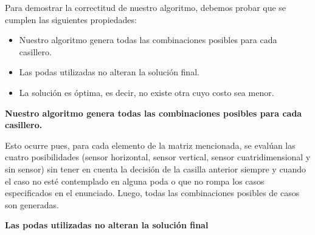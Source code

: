 Para demostrar la correctitud de nuestro algoritmo, debemos probar que se cumplen las siguientes propiedades:
\begin{itemize}
\item Nuestro algoritmo genera todas las combinaciones posibles para cada casillero.
\item Las podas utilizadas no alteran la solución final.
\item La solución es óptima, es decir, no existe otra cuyo costo sea menor.
\end{itemize}

\newline

\textbf{Nuestro algoritmo genera todas las combinaciones posibles para cada casillero.} \newline

Esto ocurre pues, para cada elemento de la matriz mencionada, se evalúan las cuatro posibilidades (sensor horizontal, sensor vertical, sensor cuatridimensional y sin sensor) sin tener en cuenta la decisión de la casilla anterior siempre y cuando el caso no esté contemplado en alguna poda o que no rompa los casos especificados en el enunciado. Luego, todas las combinaciones posibles de casos son generadas.\newline
\newline 

\textbf{Las podas utilizadas no alteran la solución final} \newline

